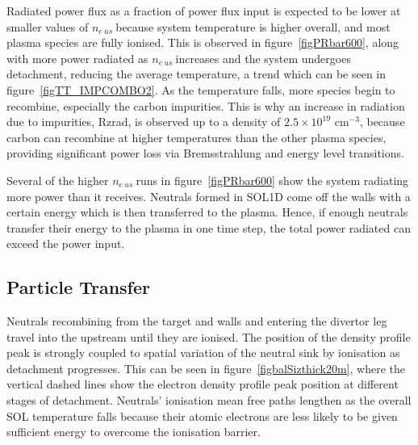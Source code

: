 \documentclass[12pt]{article}  %
\providecommand{\noNe}[1]{{${#1}\times 10^{19}$ cm$^{-3}$}} %
\providecommand{\neus}{$n_{e~us}~$} %
\begin{document}
Radiated power flux as a fraction of power flux input is expected to be lower at smaller values of \neus because system temperature is higher overall, and most plasma species are fully ionised. This is observed in figure~\ref{figPRbar600}, along with more power radiated as \neus increases and the system undergoes detachment, reducing the average temperature, a trend which can be seen in figure~\ref{figTT_IMPCOMBO2}. As the temperature falls, more species begin to recombine, especially the carbon impurities. This is why an increase in radiation due to impurities, Rzrad, is observed up to a density of \noNe{2.5}, because carbon can recombine at higher temperatures than the other plasma species, providing significant power loss via Bremsstrahlung and energy level transitions.

Several of the higher \neus runs in figure~\ref{figPRbar600} show the system radiating more power than it receives. Neutrals formed in SOL1D come off the walls with a certain energy which is then transferred to the plasma. Hence, if enough neutrals transfer their energy to the plasma in one time step, the total power radiated can exceed the power input.


\subsection{Particle Transfer}\label{ssecPtrans}
Neutrals recombining from the target and walls and entering the divertor leg travel into the upstream until they are ionised. The position of the density profile peak is strongly coupled to spatial variation of the neutral sink by ionisation as detachment progresses. This can be seen in figure~\ref{figbalSizthick20m}, where the vertical dashed lines show the electron density profile peak position at different stages of detachment. Neutrals' ionisation mean free paths lengthen as the overall SOL temperature falls because their atomic electrons are less likely to be given sufficient energy to overcome the ionisation barrier.
\end{document}
